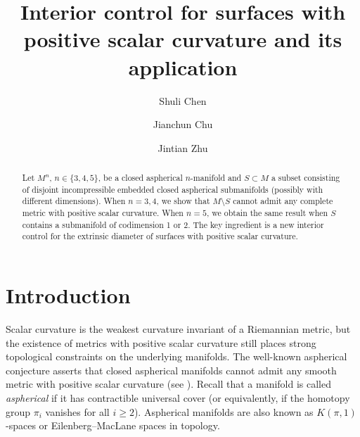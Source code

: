 \documentclass[11pt, reqno]{amsart}
\numberwithin{equation}{section}
\theoremstyle{definition}
\begin{document}
\title[Interior control]{Interior control for surfaces with positive scalar curvature and its application}


\author[S. Chen]{Shuli Chen}
\address[Shuli Chen]{Department of Mathematics, University of Chicago, 5734 S University Ave, Chicago IL, 60637, United States}

\author[J. Chu]{Jianchun Chu}
\address[Jianchun Chu]{School of Mathematical Sciences, Peking University, Yiheyuan Road 5, Beijing 100871, People's Republic of China}

\author[J. Zhu]{Jintian Zhu}
\address[Jintian Zhu]{Institute for Theoretical Sciences, Westlake University, 600 Dunyu Road, Hangzhou, Zhejiang 310030, People's Republic of China}

\renewcommand{\subjclassname}{\textup{2020} Mathematics Subject Classification}

\begin{abstract}
Let $M^{n}$, $n\in\{3,4,5\}$, be a closed aspherical $n$-manifold and $S\subset M$ a subset consisting of disjoint incompressible embedded closed aspherical submanifolds (possibly with different dimensions). When $n =3,4$, we show that $M\setminus S$ cannot admit any complete metric with positive scalar curvature. When $n=5$, we obtain the same result when $S$ contains a submanifold of codimension 1 or 2. The key ingredient is a new interior control for the extrinsic diameter of surfaces with positive scalar curvature.
\end{abstract}

\maketitle

\section{Introduction}\label{Introduction}
Scalar curvature is the weakest curvature invariant of a Riemannian metric, but the existence of metrics with positive scalar curvature
still places strong topological constraints on the underlying manifolds. The well-known
aspherical conjecture asserts that closed aspherical manifolds cannot
admit any smooth metric with positive scalar curvature (see \cite{Ros84,SY87,Gro86}). Recall that a manifold is called \emph{aspherical} if it has contractible universal cover (or equivalently, if the homotopy group $\pi_i$ vanishes for all $i\geq 2$).
Aspherical manifolds are also known as $K(\pi,1)$-spaces or Eilenberg--MacLane spaces in topology.
\end{document}
